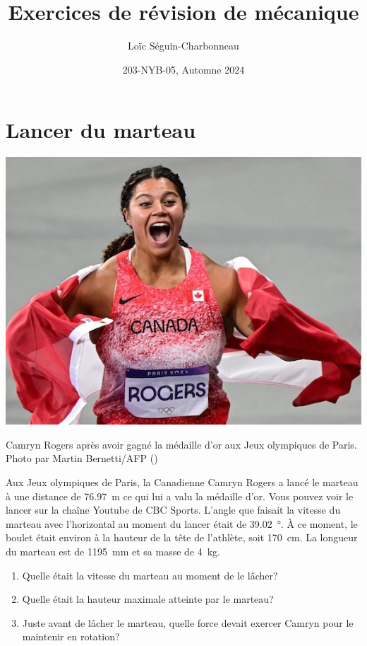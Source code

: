 \documentclass[nofonts]{tufte-handout}
\title{Exercices de révision de mécanique}
\author{Loïc Séguin-Charbonneau}
\date{203-NYB-05, Automne 2024}
\begin{document}
\maketitle

\section{Lancer du marteau}

\begin{marginfigure}[10\baselineskip]
  \includegraphics[width=\marginparwidth]{figures/camryn_rogers.jpg}
  \caption{Camryn Rogers après avoir gagné la médaille d'or aux Jeux olympiques
  de Paris. Photo par Martin Bernetti/AFP (\citet{hill_2024})}
\end{marginfigure}
Aux Jeux olympiques de Paris, la Canadienne Camryn Rogers a lancé le marteau à
une distance de \qty{76.97}{\meter} ce qui lui a valu la médaille d'or. Vous
pouvez voir le lancer sur la chaîne Youtube de CBC Sports\cite{youtube_cbc}. L'angle
que faisait la vitesse du marteau avec l'horizontal au moment du lancer était
de \qty{39.02}{\degree}. À ce moment, le boulet était environ à la
hauteur de la tête de l'athlète, soit \qty{170}{\centi\meter}. La longueur du marteau est
de \qty{1195}{\milli\meter} et sa masse de \qty{4}{\kilo\gram}.

\begin{enumerate}[label=\alph*)]
  \item Quelle était la vitesse du marteau au moment de le lâcher?
  \item Quelle était la hauteur maximale atteinte par le marteau?
  \item Juste avant de lâcher le marteau, quelle force devait exercer Camryn
    pour le maintenir en rotation?
\end{enumerate}
\end{document}
